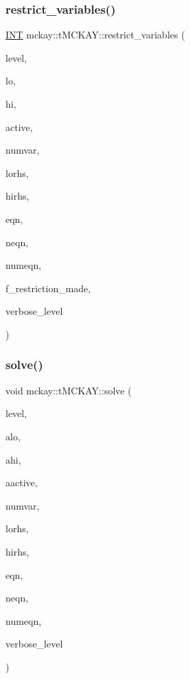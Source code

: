 \subsubsection{\texorpdfstring{restrict\+\_\+variables()}{restrict\_variables()}}
{\footnotesize\ttfamily \mbox{\hyperlink{galois_8h_a09fddde158a3a20bd2dcadb609de11dc}{I\+NT}} mckay\+::t\+M\+C\+K\+A\+Y\+::restrict\+\_\+variables (\begin{DoxyParamCaption}\item[{int}]{level,  }\item[{vector$<$ int $>$ \&}]{lo,  }\item[{vector$<$ int $>$ \&}]{hi,  }\item[{vector$<$ bool $>$ \&}]{active,  }\item[{int}]{numvar,  }\item[{vector$<$ int $>$ \&}]{lorhs,  }\item[{vector$<$ int $>$ \&}]{hirhs,  }\item[{vector$<$ \mbox{\hyperlink{namespacemckay_a4f7cb66ed07fe573b2b08e73ab462c1a}{equation}} $>$ \&}]{eqn,  }\item[{vector$<$ int $>$ \&}]{neqn,  }\item[{int}]{numeqn,  }\item[{\mbox{\hyperlink{galois_8h_a09fddde158a3a20bd2dcadb609de11dc}{I\+NT}} \&}]{f\+\_\+restriction\+\_\+made,  }\item[{int}]{verbose\+\_\+level }\end{DoxyParamCaption})\hspace{0.3cm}{\ttfamily [protected]}}

\mbox{\label{classmckay_1_1t_m_c_k_a_y_a56834d9ca4b27c64bde14b8b6c1bceee}} 
\subsubsection{\texorpdfstring{solve()}{solve()}}
{\footnotesize\ttfamily void mckay\+::t\+M\+C\+K\+A\+Y\+::solve (\begin{DoxyParamCaption}\item[{int}]{level,  }\item[{vector$<$ int $>$ \&}]{alo,  }\item[{vector$<$ int $>$ \&}]{ahi,  }\item[{vector$<$ bool $>$ \&}]{aactive,  }\item[{int}]{numvar,  }\item[{vector$<$ int $>$ \&}]{lorhs,  }\item[{vector$<$ int $>$ \&}]{hirhs,  }\item[{vector$<$ \mbox{\hyperlink{namespacemckay_a4f7cb66ed07fe573b2b08e73ab462c1a}{equation}} $>$ \&}]{eqn,  }\item[{vector$<$ int $>$ \&}]{neqn,  }\item[{int}]{numeqn,  }\item[{int}]{verbose\+\_\+level }\end{DoxyParamCaption})\hspace{0.3cm}{\ttfamily [protected]}}

